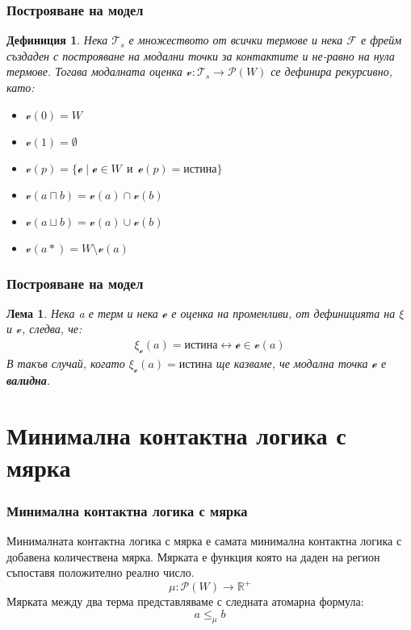 \documentclass{beamer}
\newtheorem{defn}{Дефиниция}[section]
\newtheorem{lema}{Лема}[section]
\newcommand{\curvedE}{\mathscr{e}}
\newcommand{\vE}{\mathscr{v}}
\newcommand{\vBool}{\xi}
\newcommand{\Ts}{\mathcal{T}_s}
\begin{document}
\begin{frame}\frametitle{Построяване на модел}
	\begin{defn}
		Нека $\Ts$ е множеството от всички термове и нека $\mathcal{F}$ е фрейм създаден с построяване на модални точки за контактите и не-равно на нула термове.
		Тогава модалната оценка $\vE : \Ts \rightarrow \mathscr{P}(W)$ се дефинира рекурсивно, като:
		\begin{itemize}
			\item $\vE(0) = W$
			\item $\vE(1) = \emptyset$
			\item $\vE(p) = \{ \curvedE \; | \; \curvedE \in W \:\:\textit{и}\:\: \curvedE(p) = \textit{истина} \}$
			\item $\vE(a \sqcap b) = \vE(a) \cap \vE(b)$
			\item $\vE(a \sqcup b) = \vE(a) \cup \vE(b)$
			\item $\vE(a*) = W \setminus \vE(a)$
		\end{itemize}
	\end{defn}
\end{frame}

\begin{frame}\frametitle{Построяване на модел}
	\begin{lema}
		Нека a е терм и нека $\curvedE$ е оценка на променливи, от дефиницията на $\vBool$ и $\vE$, следва, че:
		\begin{align*}
			\vBool_{\curvedE}(a) = истина \leftrightarrow \curvedE \in \vE(a)
		\end{align*}
		В такъв случай, когато $\vBool_{\curvedE}(a) = \textbf{истина}$ ще казваме, че модална точка  $\curvedE$ е \textbf{валидна}.
	\end{lema}
\end{frame}

\section{Минимална контактна логика с мярка}
\begin{frame}\frametitle{Минимална контактна логика с мярка}
Минималната контактна логика с мярка е самата минимална контактна логика с добавена количествена мярка.
\newline
\newline
Мярката е функция която на даден на регион съпоставя положително реално число.
\begin{equation*}
	\mu : \mathscr{P}(W) \longrightarrow \mathbb{R}^+
\end{equation*}
Мярката между два терма представляваме с следната атомарна формула:
	\begin{equation*} 
		a \le_\mu b
	\end{equation*}
\end{frame}
\end{document}
